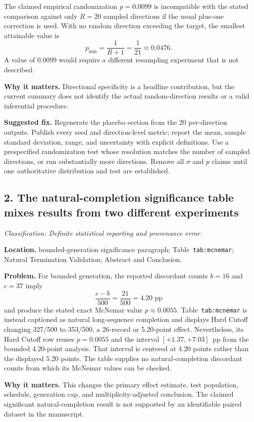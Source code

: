 \documentclass[11pt]{article}
\newcommand{\findinglabel}[1]{\textbf{#1}}
\newcommand{\classification}[1]{\textit{Classification: #1.}}
\begin{document}
The claimed empirical randomization $p=0.0099$ is incompatible with the stated comparison against only $R=20$ sampled directions if the usual plus-one correction is used.  With no random direction exceeding the target, the smallest attainable value is
\[
p_{\min}=\frac{1}{R+1}=\frac{1}{21}\approx0.0476.
\]
A value of 0.0099 would require a different resampling experiment that is not described.

\findinglabel{Why it matters.} Directional specificity is a headline contribution, but the current summary does not identify the actual random-direction results or a valid inferential procedure.

\findinglabel{Suggested fix.} Regenerate the placebo section from the 20 per-direction outputs.  Publish every seed and direction-level metric; report the mean, sample standard deviation, range, and uncertainty with explicit definitions.  Use a prespecified randomization test whose resolution matches the number of sampled directions, or run substantially more directions.  Remove all $\sigma$ and $p$ claims until one authoritative distribution and test are established.

\subsection*{2. The natural-completion significance table mixes results from two different experiments}

\classification{Definite statistical reporting and provenance error}

\findinglabel{Location.} bounded-generation significance paragraph; Table~\texttt{tab:mcnemar}; Natural Termination Validation; Abstract and Conclusion.

\findinglabel{Problem.} For bounded generation, the reported discordant counts $b=16$ and $c=37$ imply
\[
\frac{c-b}{500}=\frac{21}{500}=4.20\text{ pp}
\]
and produce the stated exact McNemar value $p\approx0.0055$.  Table~\texttt{tab:mcnemar} is instead captioned as natural long-sequence completion and displays Hard Cutoff changing 327/500 to 353/500, a 26-record or 5.20-point effect.  Nevertheless, its Hard Cutoff row reuses $p=0.0055$ and the interval $[+1.37,+7.03]$~pp from the bounded 4.20-point analysis.  That interval is centered at 4.20 points rather than the displayed 5.20 points.  The table supplies no natural-completion discordant counts from which its McNemar values can be checked.

\findinglabel{Why it matters.} This changes the primary effect estimate, test population, schedule, generation cap, and multiplicity-adjusted conclusion.  The claimed significant natural-completion result is not supported by an identifiable paired dataset in the manuscript.
\end{document}
